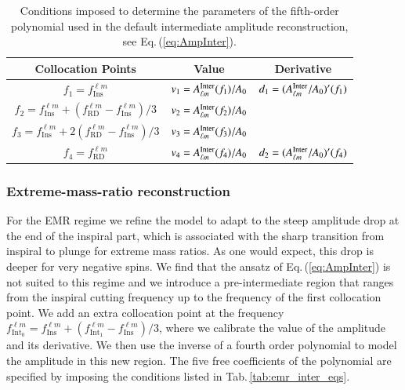 \documentclass[twocolumn,prd,aps,superscriptaddress,preprintnumbers,tightenlines,showpacs,nofootinbib,eqsecnum,amsfonts,amsmath]{revtex4}
\begin{document}
\begin{table}[ht]
\centering
\caption{Conditions imposed to determine the parameters of the fifth-order polynomial used in the default intermediate amplitude reconstruction, see Eq.\,(\ref{eq:AmpInter}).}
\label{tab:default_inter_eqs}
{\renewcommand{\arraystretch}{1.5}
\begin{tabular}{|c|c|c|}
\hline
Collocation Points                              & Value                      & Derivative                            \\ \hline
$f_1=f_{\mathrm{Ins}}^{\ell m} $                                 & $v_1 = A^{\rm{Inter}}_{\ell m} (f_1)/A_0$ & $d_1 = (A^{\rm{Inter}}_{\ell m}/A_0)^{\prime} (f_1)$   \\
$f_2=f_{\mathrm{Ins}}^{\ell m} + (f_{\mathrm{RD}}^{\ell m}-f_{\mathrm{Ins}}^{\ell m})/3$ & $v_2 = A^{\rm{Inter}}_{\ell m} (f_2)/A_0$ &                                \\
$f_3=f_{\mathrm{Ins}}^{\ell m} + 2(f_{\mathrm{RD}}^{\ell m}-f_{\mathrm{Ins}}^{\ell m})/3$                            & $v_3 = A^{\rm{Inter}}_{\ell m} (f_3)/A_0$ &   \\ 
$f_4=f_{\mathrm{RD}}^{\ell m}$ &$v_4 = A^{\rm{Inter}}_{\ell m} (f_4)/A_0$ &$d_2 = (A^{\rm{Inter}}_{\ell m}/A_0)^{\prime} (f_4)$
\\\hline
\end{tabular}}
\end{table}



\subsubsection{Extreme-mass-ratio reconstruction} \label{subsec:emr_inter_amp}
For the EMR regime we refine the model to adapt to the steep amplitude drop at the end of the inspiral part, which is associated with the sharp transition from inspiral to plunge for extreme mass ratios. As one would expect, this drop is deeper for very negative spins. We find that the ansatz of Eq.\,(\ref{eq:AmpInter}) is not suited to this regime and we introduce a pre-intermediate region that ranges from the inspiral cutting frequency up to the frequency of the first collocation point. We add an extra collocation point at the frequency $f_{\mathrm{Int_0}}^{\ell m} = f_{\mathrm{Ins}}^{\ell m}+(f_{\mathrm{Int_1}}^{\ell m}-f_{\mathrm{Ins}}^{\ell m})/3$, where we calibrate the value of the amplitude and its derivative. We then use the inverse of a fourth order polynomial to model the amplitude in this new region. The five free coefficients of the polynomial are specified by imposing the conditions listed in Tab.\,\ref{tab:emr_inter_eqs}. 
\end{document}
